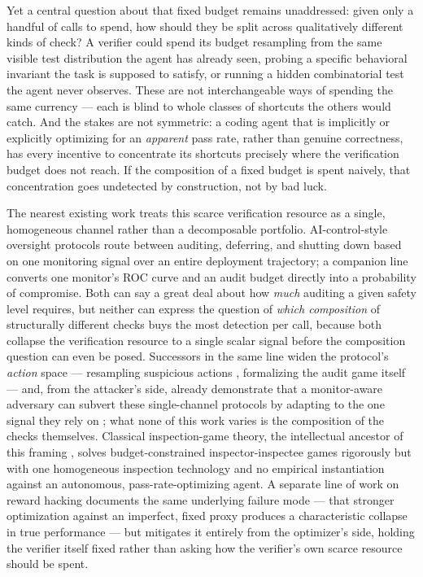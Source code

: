 \documentclass[11pt]{article}
\begin{document}
Yet a central question about that fixed budget remains unaddressed: given only a handful of calls to spend, how should they be split across qualitatively different kinds of check? A verifier could spend its budget resampling from the same visible test distribution the agent has already seen, probing a specific behavioral invariant the task is supposed to satisfy, or running a hidden combinatorial test the agent never observes. These are not interchangeable ways of spending the same currency --- each is blind to whole classes of shortcuts the others would catch. And the stakes are not symmetric: a coding agent that is implicitly or explicitly optimizing for an \emph{apparent} pass rate, rather than genuine correctness, has every incentive to concentrate its shortcuts precisely where the verification budget does not reach. If the composition of a fixed budget is spent naively, that concentration goes undetected by construction, not by bad luck.

The nearest existing work treats this scarce verification resource as a single, homogeneous channel rather than a decomposable portfolio. AI-control-style oversight protocols \citep{AIControl2024} route between auditing, deferring, and shutting down based on one monitoring signal over an entire deployment trajectory; a companion line \citep{ControlTax2024} converts one monitor's ROC curve and an audit budget directly into a probability of compromise. Both can say a great deal about how \emph{much} auditing a given safety level requires, but neither can express the question of \emph{which composition} of structurally different checks buys the most detection per call, because both collapse the verification resource to a single scalar signal before the composition question can even be posed. Successors in the same line widen the protocol's \emph{action} space --- resampling suspicious actions \citep{CtrlZ2025}, formalizing the audit game itself \citep{GamesForAIControl2024} --- and, from the attacker's side, already demonstrate that a monitor-aware adversary can subvert these single-channel protocols by adapting to the one signal they rely on \citep{AdaptiveAttacksMonitors2025,AttackSelectionConcentrated2026}; what none of this work varies is the composition of the checks themselves. Classical inspection-game theory, the intellectual ancestor of this framing \citep{AvenhausInspectionGames2002}, solves budget-constrained inspector-inspectee games rigorously but with one homogeneous inspection technology and no empirical instantiation against an autonomous, pass-rate-optimizing agent. A separate line of work on reward hacking \citep{InfTimeRewardHacking2024} documents the same underlying failure mode --- that stronger optimization against an imperfect, fixed proxy produces a characteristic collapse in true performance --- but mitigates it entirely from the optimizer's side, holding the verifier itself fixed rather than asking how the verifier's own scarce resource should be spent.
\end{document}
